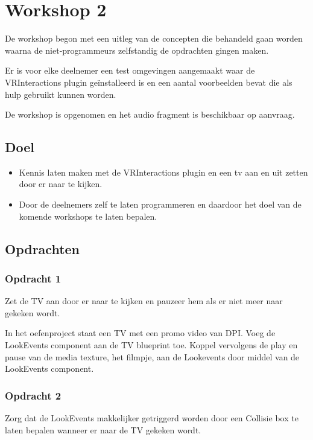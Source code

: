 
\chapter{Workshop 2}
\label{appendix:workshop2}
\lhead{}
De workshop begon met een uitleg van de concepten die behandeld gaan worden waarna de niet-programmeurs zelfstandig de opdrachten gingen maken.

Er is voor elke deelnemer een test omgevingen aangemaakt waar de VRInteractions plugin geïnstalleerd is en een aantal voorbeelden bevat die als hulp gebruikt kunnen worden.

De workshop is opgenomen en het audio fragment is beschikbaar op aanvraag.

\section{Doel}
\begin{itemize}
	\item Kennis laten maken met de VRInteractions plugin en een tv aan en uit zetten door er naar te kijken.
	\item Door de deelnemers zelf te laten programmeren en daardoor het doel van de komende workshops te laten bepalen. 
\end{itemize}

\section{Opdrachten}

\subsection{Opdracht 1}
Zet de TV aan door er naar te kijken en pauzeer hem als er niet meer naar gekeken wordt.

In het oefenproject staat een TV met een promo video van DPI. 
Voeg de LookEvents component aan de TV blueprint toe.
Koppel vervolgens de play en pause van de media texture, het filmpje, aan de Lookevents door middel van de LookEvents component.

\subsection{Opdracht 2}
Zorg dat de LookEvents makkelijker getriggerd worden door een Collisie box te laten bepalen wanneer er naar de TV gekeken wordt.

